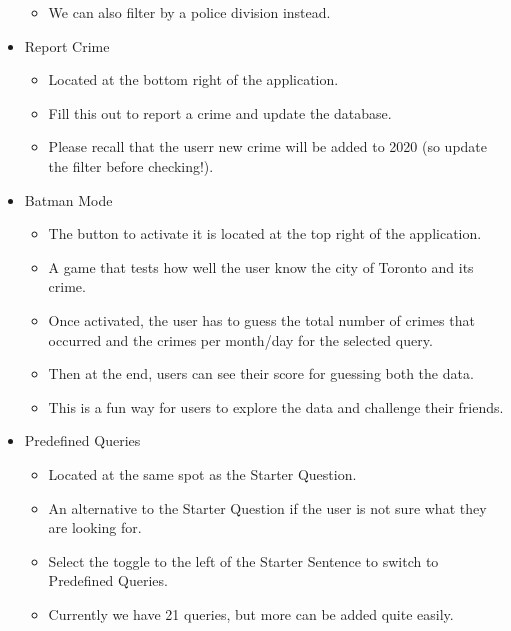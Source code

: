\documentclass[12pt, a4paper]{article}
\begin{document}
\begin{itemize}
\begin{itemize}
        \item We can also filter by a police division instead.
    \end{itemize}
    \item Report Crime
    \begin{itemize}
        \item Located at the bottom right of the application.
        \item Fill this out to report a crime and update the database.
        \item Please recall that the userr new crime will be added to 2020 (so update the filter before checking!).
    \end{itemize}
    \item Batman Mode
    \begin{itemize}
        \item The button to activate it is located at the top right of the application.
        \item A game that tests how well the user know the city of Toronto and its crime. 
        \item Once activated, the user has to guess the total number of crimes that occurred and the crimes per month/day for the selected query.
        \item Then at the end, users can see their score for guessing both the data.
        \item This is a fun way for users to explore the data and challenge their friends.
    \end{itemize}
    \item Predefined Queries
    \begin{itemize}
        \item Located at the same spot as the Starter Question.
        \item An alternative to the Starter Question if the user is not sure what they are looking for.
        \item Select the toggle to the left of the Starter Sentence to switch to Predefined Queries.
        \item Currently we have 21 queries, but more can be added quite easily.
    \end{itemize}
\end{itemize}
\color{blue}
\end{document}
